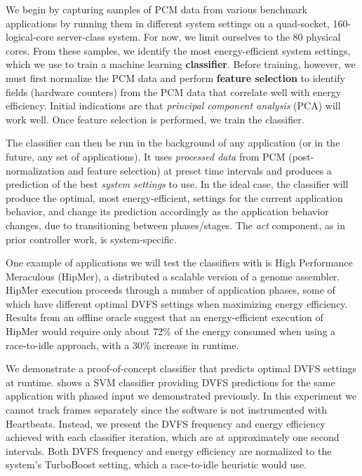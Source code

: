 We begin by capturing samples of PCM data from various benchmark applications by running them in different system settings on a quad-socket, 160-logical-core server-class system.
For now, we limit ourselves to the 80 physical cores.
From these samples, we identify the most energy-efficient system settings, which we use to train a machine learning \textbf{classifier}.
Before training, however, we must first normalize the PCM data and perform \textbf{feature selection} to identify fields (hardware counters) from the PCM data that correlate well with energy efficiency.
Initial indications are that \emph{principal component analysis} (PCA) will work well.
Once feature selection is performed, we train the classifier.

The classifier can then be run in the background of any application (or in the future, any set of applications).
It uses \emph{processed data} from PCM (post-normalization and feature selection) at preset time intervals and produces a prediction of the best \emph{system settings} to use.
In the ideal case, the classifier will produce the optimal, \ie most energy-efficient, settings for the current application behavior, and change its prediction accordingly as the application behavior changes, \eg due to transitioning between phases/stages.
The \emph{act} component, as in prior controller work, is system-specific.

One example of applications we will test the classifiers with is High Performance Meraculous (HipMer), a distributed a scalable version of a genome assembler.
HipMer execution proceeds through a number of application phases, some of which have different optimal DVFS settings when maximizing energy efficiency.
Results from an offline oracle suggest that an energy-efficient execution of HipMer would require only about 72\% of the energy consumed when using a race-to-idle approach, with a 30\% increase in runtime.

We demonstrate a proof-of-concept classifier that predicts optimal DVFS settings at runtime.
 shows a SVM classifier providing DVFS predictions for the same  application with phased input we demonstrated previously.
In this experiment we cannot track frames separately since the software is not instrumented with Heartbeats.
Instead, we present the DVFS frequency and energy efficiency achieved with each classifier iteration, which are at approximately one second intervals.
Both DVFS frequency and energy efficiency are normalized to the system's TurboBoost setting, which a race-to-idle heuristic would use.

